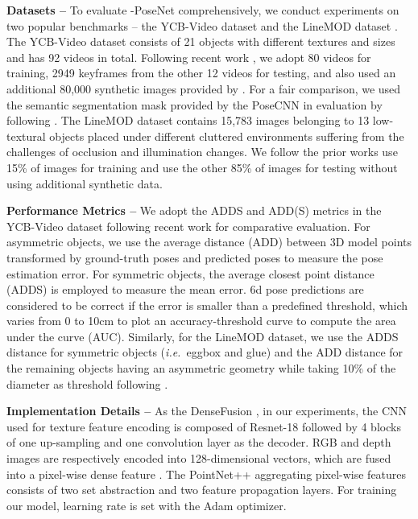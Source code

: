 \documentclass[letterpaper, 10 pt, conference]{ieeeconf}
\def\ie{\emph{i.e.~}} \def\Ie{\emph{I.e.}~}
\begin{document}
\vspace{0.1cm}\noindent \textbf{Datasets --}
To evaluate -PoseNet comprehensively, we conduct experiments on two popular benchmarks -- the YCB-Video dataset \cite{xiang2017posecnn} and the LineMOD dataset \cite{hinterstoisser2011multimodal}.
The YCB-Video dataset consists of 21 objects with different textures and sizes and has 92 videos in total. 
Following recent work \cite{xiang2017posecnn,wang2019densefusion,cheng20196d}, we adopt 80 videos for training, 2949 keyframes from the other 12 videos for testing, and also used an additional 80,000 synthetic images provided by \cite{xiang2017posecnn}. 
For a fair comparison, we used the semantic segmentation mask provided by the PoseCNN in evaluation by following \cite{xiang2017posecnn,wang2019densefusion}.
The LineMOD dataset contains 15,783 images belonging to 13 low-textural objects placed under different cluttered environments suffering from the challenges of occlusion and illumination changes. 
We follow the prior works \cite{wang2019densefusion,cheng20196d} use 15\% of images for training and use the other 85\% of images for testing without using additional synthetic data.



\vspace{0.1cm}\noindent\textbf{Performance Metrics --}
We adopt the ADDS and ADD(S) metrics in the YCB-Video dataset following recent work \cite{xiang2017posecnn,wang2019densefusion} for comparative evaluation. 
For asymmetric objects, we use the average distance (ADD) between 3D model points transformed by ground-truth poses and predicted poses to measure the pose estimation error. 
For symmetric objects, the average closest point distance (ADDS) is employed to measure the mean error. 
6d pose predictions are considered to be correct if the error is smaller than a predefined threshold, which varies from 0 to 10cm to plot an accuracy-threshold curve to compute the area under the curve (AUC).
Similarly, for the LineMOD dataset, we use the ADDS distance for symmetric objects (\ie eggbox and glue) and the ADD distance for the remaining objects having an asymmetric geometry while taking 10\% of the diameter as threshold following \cite{wang2019densefusion,rad2017bb8}.





\vspace{0.1cm}\noindent\textbf{Implementation Details --} 
As the DenseFusion \cite{wang2019densefusion}, in our experiments, the CNN used for texture feature encoding is composed of Resnet-18 \cite{he2016deep} followed by 4 blocks of one up-sampling and one convolution layer as the decoder. 
RGB and depth images are respectively encoded into 128-dimensional vectors, which are fused into a pixel-wise dense feature . 
The PointNet++ \cite{qi2017pointnet++} aggregating pixel-wise features consists of two set abstraction and two feature propagation layers. 
For training our model, learning rate is set  with the Adam optimizer. 
\end{document}
